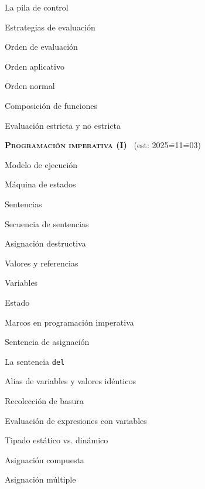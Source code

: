 \begin{longenum}
\begin{longenum}
        \item La pila de control
        \item Estrategias de evaluación \opcional\
        \begin{longenum}
            \item Orden de evaluación
            \begin{longenum}
                \item Orden aplicativo
                \item Orden normal
            \end{longenum}
            \item Composición de funciones
            \item Evaluación estricta y no estricta
        \end{longenum}
    \end{longenum}
    \item \textbf{\textsc{Programación imperativa (I)}} \ev1\ (est: 2025\==11\==03)
    \begin{longenum}
        \item Modelo de ejecución
        \begin{longenum}
            \item Máquina de estados
            \item Sentencias
            \item Secuencia de sentencias
        \end{longenum}
        \item Asignación destructiva
        \begin{longenum}
            \item Valores y referencias
            \item Variables
            \item Estado
            \item Marcos en programación imperativa
            \item Sentencia de asignación
            \item La sentencia \texttt{del}
            \item Alias de variables y valores idénticos
            \item Recolección de basura
            \item Evaluación de expresiones con variables
            \item Tipado estático vs. dinámico
            \item Asignación compuesta
            \item Asignación múltiple

\end{longenum}
\end{longenum}
\end{longenum}
